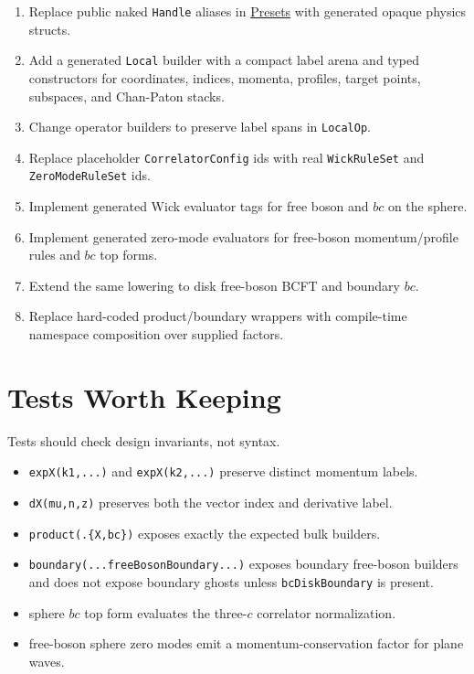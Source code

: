 \documentclass[11pt]{article}
\begin{document}
\begin{enumerate}
\item Replace public naked \texttt{Handle} aliases in \href{../org/cft-code/presets/presets.org}{Presets} with generated opaque
physics structs.
\item Add a generated \texttt{Local} builder with a compact label arena and typed
constructors for coordinates, indices, momenta, profiles, target points,
subspaces, and Chan-Paton stacks.
\item Change operator builders to preserve label spans in \texttt{LocalOp}.
\item Replace placeholder \texttt{CorrelatorConfig} ids with real \texttt{WickRuleSet} and
\texttt{ZeroModeRuleSet} ids.
\item Implement generated Wick evaluator tags for free boson and \(bc\) on the
sphere.
\item Implement generated zero-mode evaluators for free-boson momentum/profile
rules and \(bc\) top forms.
\item Extend the same lowering to disk free-boson BCFT and boundary \(bc\).
\item Replace hard-coded product/boundary wrappers with compile-time namespace
composition over supplied factors.
\end{enumerate}
\section{Tests Worth Keeping}
\label{sec:org017d4c1}

Tests should check design invariants, not syntax.

\begin{itemize}
\item \texttt{expX(k1,...)} and \texttt{expX(k2,...)} preserve distinct momentum labels.
\item \texttt{dX(mu,n,z)} preserves both the vector index and derivative label.
\item \texttt{product(.\{X,bc\})} exposes exactly the expected bulk builders.
\item \texttt{boundary(...freeBosonBoundary...)} exposes boundary free-boson builders and
does not expose boundary ghosts unless \texttt{bcDiskBoundary} is present.
\item sphere \(bc\) top form evaluates the three-\(c\) correlator normalization.
\item free-boson sphere zero modes emit a momentum-conservation factor for plane
waves.
\end{itemize}
\end{document}

